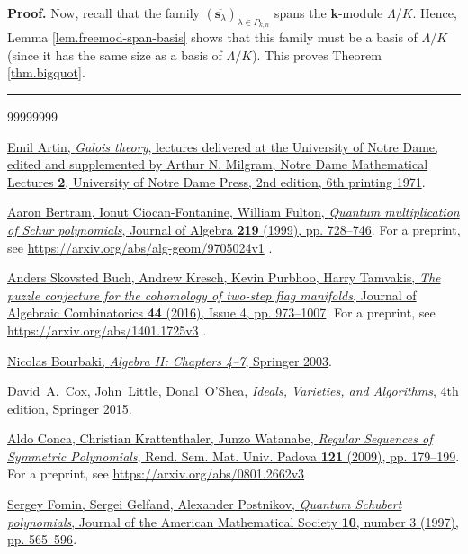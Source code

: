 \documentclass[numbers=enddot,12pt,final,onecolumn,notitlepage]{scrartcl}%
\theoremstyle{definition}
\newenvironment{proof}[1][Proof]{\noindent\textbf{#1.} }{\ \rule{0.5em}{0.5em}}
\begin{document}
\begin{proof}
Now, recall that the family $\left(  \overline{\mathbf{s}_{\lambda}}\right)
_{\lambda\in P_{k,n}}$ spans the $\mathbf{k}$-module $\Lambda/K$. Hence, Lemma
\ref{lem.freemod-span-basis} shows that this family must be a basis of
$\Lambda/K$ (since it has the same size as a basis of $\Lambda/K$). This
proves Theorem \ref{thm.bigquot}.
\end{proof}

\begin{thebibliography}{99999999}                                                                                         %


%
\href{https://projecteuclid.org/ebooks/notre-dame-mathematical-lectures/Galois-Theory/toc/ndml/1175197041}{Emil
Artin, \textit{Galois theory}, lectures delivered at the University of Notre
Dame, edited and supplemented by Arthur N. Milgram, Notre Dame Mathematical
Lectures \textbf{2}, University of Notre Dame Press, 2nd edition, 6th printing
1971}.

%
\href{https://doi.org/10.1006/jabr.1999.7960}{Aaron Bertram, Ionut
Ciocan-Fontanine, William Fulton, \textit{Quantum multiplication of Schur
polynomials}, Journal of Algebra \textbf{219} (1999), pp. 728--746}. For a
preprint, see \url{https://arxiv.org/abs/alg-geom/9705024v1} .

%
\href{https://doi.org/10.1007/s10801-016-0697-3}{Anders Skovsted Buch, Andrew
Kresch, Kevin Purbhoo, Harry Tamvakis, \textit{The puzzle conjecture for the
cohomology of two-step flag manifolds}, Journal of Algebraic Combinatorics
\textbf{44} (2016), Issue 4, pp. 973--1007}. For a preprint, see
\url{https://arxiv.org/abs/1401.1725v3} .

%
\href{https://doi.org/10.1007/978-3-642-61698-3}{Nicolas Bourbaki,
\textit{Algebra II: Chapters 4--7}, Springer 2003}.

David~A.~Cox, John~Little, Donal~O'Shea,
\textit{Ideals, Varieties, and Algorithms}, 4th edition, Springer 2015.

%
\href{http://www.numdam.org/article/RSMUP_2009__121__179_0.pdf}{Aldo Conca,
Christian Krattenthaler, Junzo Watanabe, \textit{Regular Sequences of
Symmetric Polynomials}, Rend. Sem. Mat. Univ. Padova \textbf{121} (2009), pp.
179--199}. For a preprint, see \url{https://arxiv.org/abs/0801.2662v3}

%
\href{https://doi.org/10.1090/S0894-0347-97-00237-3}{Sergey Fomin, Sergei
Gelfand, Alexander Postnikov, \textit{Quantum Schubert polynomials}, Journal
of the American Mathematical Society \textbf{10}, number 3 (1997), pp.
565--596}.


\end{thebibliography}
\end{document}
